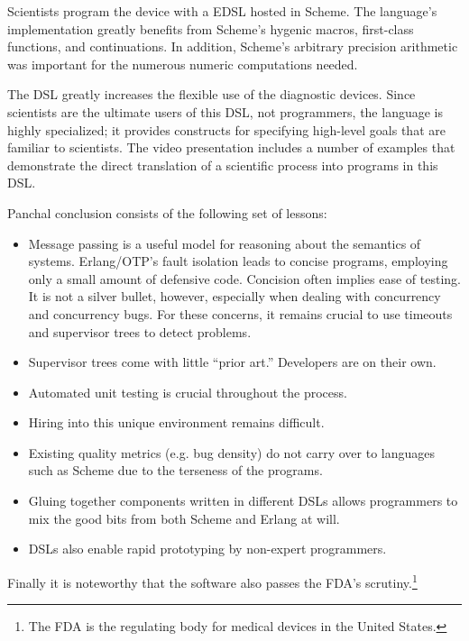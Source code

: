 \documentclass{jfp1}
\begin{document}
Scientists program the device with a EDSL hosted in Scheme. The language's
implementation greatly benefits from Scheme's hygenic macros, first-class
functions, and continuations. In addition, Scheme's arbitrary precision
arithmetic was important for the numerous numeric computations needed.

The DSL greatly increases the flexible use of the diagnostic devices.
Since scientists are the ultimate users of this DSL, not programmers, the
language is highly specialized; it provides constructs for specifying
high-level goals that are familiar to scientists. The video presentation
includes a number of examples that demonstrate the direct translation of a
scientific process into programs in this DSL. 

Panchal conclusion consists of the following set of lessons: 
\begin{itemize}

\item Message passing is a useful model for reasoning about the semantics
of systems. Erlang/OTP's fault isolation leads to concise programs,
employing only a small amount of defensive code. Concision often implies
ease of testing. It is not a silver bullet, however, especially when
dealing with concurrency and concurrency bugs. For these concerns, it
remains crucial to use timeouts and supervisor trees to detect problems. 

\item Supervisor trees come with little ``prior art.'' Developers are on
their own.

\item Automated unit testing is crucial throughout the process.

\item Hiring into this unique environment remains difficult. 

\item Existing quality metrics (e.g. bug density) do not carry over to
languages such as Scheme due to the terseness of the programs. 

\item Gluing together components written in different DSLs allows
programmers to mix the good bits from both Scheme and Erlang at will. 

\item DSLs also enable rapid prototyping by non-expert programmers. 
\end{itemize}
Finally it is noteworthy that the software also passes the FDA's
scrutiny.\footnote{The FDA is the regulating body for medical devices in
the United States.}
\end{document}
